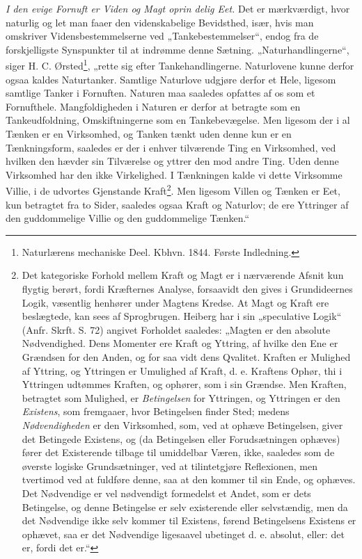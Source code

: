 \documentclass[11pt]{book}
\newcommand{\opage}[1]{\marginnote{\footnotesize\textit{[#1]}}}
\begin{document}
\emph{I den evige Fornuft er Viden og Magt oprin\-%
delig Eet.} Det er mærkværdigt, hvor naturlig og let man faaer den
videnskabelige Bevidsthed, især, hvis man omskriver
\opage{209} \setcounter{footnote}{0}%
Vidensbestemmelserne ved „Tankebestemmelser“, endog fra de
forskjelligste Synspunkter til at indrømme denne Sætning.
„Naturhandlingerne“, siger H. C. Ørsted\footnote{Naturlærens
mechaniske Deel. Kbhvn. 1844. Første Indledning.}, „rette sig efter
Tankehandlingerne. Naturlovene kunne derfor ogsaa kaldes Naturtanker.
Samtlige Naturlove udgjøre derfor et Hele, ligesom samtlige Tanker i
Fornuften. Naturen maa saaledes opfattes af os som et Fornufthele.
Mangfoldigheden i Naturen er derfor at betragte som en Tankeudfoldning,
Omskiftningerne som en Tankebevægelse. Men ligesom der i al Tænken er
en Virksomhed, og Tanken tænkt uden denne kun er en Tænkningsform,
saaledes er der i enhver tilværende Ting en Virksomhed, ved hvilken den
hævder sin Tilværelse og yttrer den mod andre Ting. Uden denne
Virksomhed har den ikke Virkelighed. I Tænkningen kalde vi dette
Virksomme Villie, i de udvortes Gjenstande Kraft\footnote{Det
kategoriske Forhold mellem Kraft og Magt er i nærværende Afsnit kun
flygtig berørt, fordi Kræfternes Analyse, forsaavidt den gives i
Grundideernes Logik, væsentlig henhører under Magtens Kredse. At Magt
og Kraft ere beslægtede, kan sees af Sprogbrugen. Heiberg har i sin
„speculative Logik“ (Anfr. Skrft. S. 72) angivet Forholdet saaledes:
„Magten er den absolute Nødvendighed. Dens Momenter ere Kraft og
Yttring, af hvilke den Ene er Grændsen for den Anden, og for saa vidt
dens Qvalitet. Kraften er Mulighed af Yttring, og Yttringen er
Umulighed af Kraft, d. e. Kraftens Ophør, thi i Yttringen udtømmes
Kraften, og ophører, som i sin Grændse. Men Kraften, betragtet som
Mulighed, er \emph{Betingelsen} for Yttringen, og Yttringen er den
\emph{Existens}, som fremgaaer, hvor Betingelsen finder Sted; medens
\emph{Nødvendigheden} er den Virksomhed, som, ved at ophæve
Betingelsen, giver det Betingede Existens, og (da Betingelsen eller
Forudsætningen ophæves) fører det Existerende tilbage til umiddelbar
Væren, ikke, saaledes som de øverste logiske Grundsætninger, ved at
tilintetgjøre Reflexionen, men tvertimod ved at fuldføre denne, saa at
den kommer til sin Ende, og ophæves. Det Nødvendige er vel nødvendigt
formedelst et Andet,
som er dets Betingelse, og denne Betingelse er selv
existerende eller selvstændig, men da det Nødvendige ikke selv kommer
til Existens, førend Betingelsens Existens er ophævet, saa er det
Nødvendige ligesaavel ubetinget d. e. absolut, eller: det er, fordi det
er.“}. Men ligesom Villen og Tænken
\opage{210} \setcounter{footnote}{0}%
er Eet, kun betragtet fra to Sider, saaledes ogsaa Kraft og Naturlov;
de ere Yttringer af den guddommelige Villie og den guddommelige
Tænken.“
\end{document}
